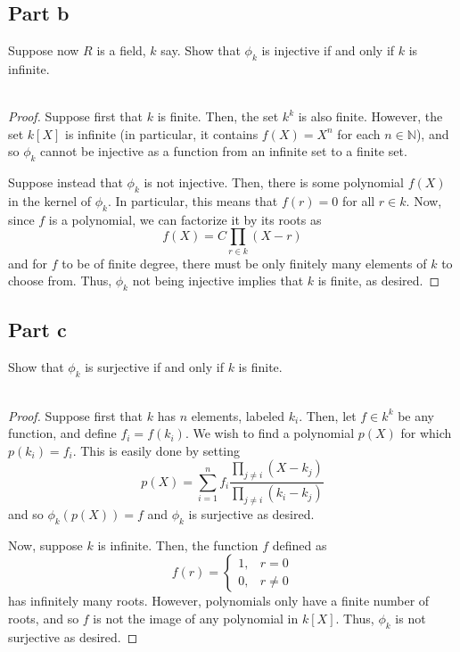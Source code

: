 \documentclass[12pt,reqno]{amsart}
\newcommand{\N}{\mathbb{N}}
\begin{document}
\subsection*{Part b}
Suppose now $R$ is a field, $k$ say. Show that $\phi_k$ is injective if and only
if $k$ is infinite.
\\
\\
\begin{proof}
    Suppose first that $k$ is finite. Then, the set $k^k$ is also finite.
    However, the set $k[X]$ is infinite (in particular, it contains $f(X)=X^n$
    for each $n\in\N$), and so $\phi_k$ cannot be injective as a function from
    an infinite set to a finite set.

    Suppose instead that $\phi_k$ is not injective. Then, there is some
    polynomial $f(X)$ in the kernel of $\phi_k$. In particular, this means that
    $f(r) = 0$ for all $r\in k$. Now, since $f$ is a polynomial, we can
    factorize it by its roots as
    \[
        f(X) = C\prod_{r\in k}(X-r)
    \]
    and for $f$ to be of finite degree, there must be only finitely many
    elements of $k$ to choose from. Thus, $\phi_k$ not being injective implies
    that $k$ is finite, as desired.
\end{proof}

\subsection*{Part c}
Show that $\phi_k$ is surjective if and only if $k$ is finite.
\\
\\
\begin{proof}
    Suppose first that $k$ has $n$ elements, labeled $k_i$. Then, let
    $f\in k^k$ be any function, and define $f_i = f(k_i)$. We wish to find a
    polynomial $p(X)$ for which $p(k_i) = f_i$. This is easily done by setting
    \[
        p(X) = \sum_{i=1}^n f_i\frac{\prod_{j\neq i}(X-k_j)}{\prod_{j\neq
        i}(k_i-k_j)}
    \]
    and so $\phi_k(p(X)) = f$ and $\phi_k$ is surjective as desired.

    Now, suppose $k$ is infinite. Then, the function $f$ defined as
    \[
        f(r) =
        \begin{cases}
            1, &r=0\\
            0, &r\neq 0
        \end{cases}
    \]
    has infinitely many roots. However, polynomials only have a finite number of
    roots, and so $f$ is not the image of any polynomial in $k[X]$. Thus,
    $\phi_k$ is not surjective as desired.
\end{proof}
\end{document}
